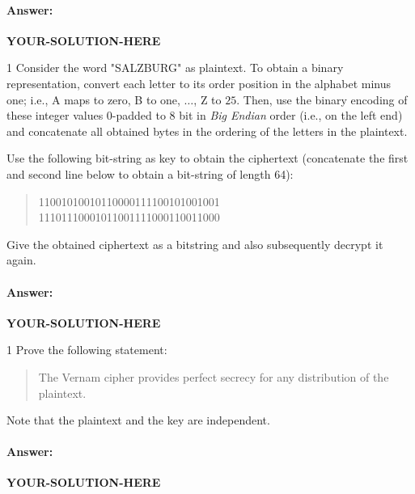 \documentclass[]{scrartcl}
\newcounter{exercise}
\newcounter{qid}[section]
\newcommand{\exerciseprefix}{prefix}
\newcommand{\questiontitle}{Questions}
\newcommand{\blockid}{B2}
\newcommand{\exname}{}
\newcommand{\yoursolutionhere}{\textbf{YOUR-SOLUTION-HERE}}
\begin{document}
\paragraph{Answer:} \yoursolutionhere{}



\renewcommand{\exerciseprefix}{PS-\blockid{}-E\theexercise: \exname-Q\theqid}
\renewcommand{\questiontitle}{\exerciseprefix{}: Encryption and decryption}
\begin{exercisebox}{1}
Consider the word "SALZBURG" as plaintext. To obtain a binary representation, convert each letter to its order position in the alphabet minus one; i.e., A maps to zero, B to one, $\ldots$, Z to $25$. Then, use the binary encoding of these integer values 0-padded to 8 bit in \emph{Big Endian} order (i.e., on the left end) and concatenate all obtained bytes in the ordering of the letters in the plaintext. 

Use the following bit-string as key to obtain the ciphertext (concatenate the first and second line below to obtain a bit-string of length 64): 
\begin{quote}
    11001010010110000111100101001001\\
    11101110001011001111000110011000
\end{quote}
Give the obtained ciphertext as a bitstring and also subsequently decrypt it again. 
\end{exercisebox}

\paragraph{Answer:} \yoursolutionhere{}



\renewcommand{\exerciseprefix}{PS-\blockid{}-E\theexercise: \exname-Q\theqid}
\renewcommand{\questiontitle}{\exerciseprefix{}: Security proof for Vernam}
\begin{exercisebox}{1}
Prove the following statement:
\begin{quote}
    The Vernam cipher provides perfect secrecy for any distribution of the plaintext. 
\end{quote}
Note that the plaintext and the key are independent.
\end{exercisebox}

\paragraph{Answer:} \yoursolutionhere{}
\end{document}
